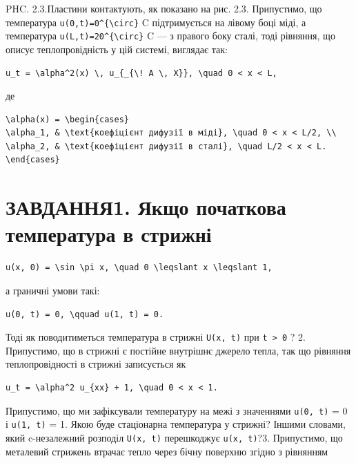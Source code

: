 \documentclass[
  ukrainian,
]{article}
\begin{document}
PHC. 2.3.Пластини контактують, як показано на рис. 2.3. Припустимо, що
температура \texttt{u(0,t)=0\^{}\{\textbackslash{}circ\}} C
підтримується на лівому боці міді, а температура
\texttt{u(L,t)=20\^{}\{\textbackslash{}circ\}} C --- з правого боку
сталі, тоді рівняння, що описує теплопровідність у цій системі, виглядає
так:

\begin{verbatim}
u_t = \alpha^2(x) \, u_{_{\! A \, X}}, \quad 0 < x < L,
\end{verbatim}

де

\begin{verbatim}
\alpha(x) = \begin{cases}
\alpha_1, & \text{коефіцієнт дифузії в міді}, \quad 0 < x < L/2, \\
\alpha_2, & \text{коефіцієнт дифузії в сталі}, \quad L/2 < x < L.
\end{cases}
\end{verbatim}

\section{ЗАВДАННЯ1. Якщо початкова температура в
стрижні}\label{ux437ux430ux432ux434ux430ux43dux43dux44f1.-ux44fux43aux449ux43e-ux43fux43eux447ux430ux442ux43aux43eux432ux430-ux442ux435ux43cux43fux435ux440ux430ux442ux443ux440ux430-ux432-ux441ux442ux440ux438ux436ux43dux456}

\begin{verbatim}
u(x, 0) = \sin \pi x, \quad 0 \leqslant x \leqslant 1,
\end{verbatim}

а граничні умови такі:

\begin{verbatim}
u(0, t) = 0, \qquad u(1, t) = 0.
\end{verbatim}

Тоді як поводитиметься температура в стрижні \texttt{U(x,\ t)} при
\texttt{t\ \textgreater{}\ 0} ? 2. Припустимо, що в стрижні є постійне
внутрішнє джерело тепла, так що рівняння теплопровідності в стрижні
записується як

\begin{verbatim}
u_t = \alpha^2 u_{xx} + 1, \quad 0 < x < 1.
\end{verbatim}

Припустимо, що ми зафіксували температуру на межі з значеннями
\texttt{u(0,\ t)} = 0 і \texttt{u(1,\ t)} = 1. Якою буде стаціонарна
температура у стрижні? Іншими словами, який c-незалежний розподіл
\texttt{U(x,\ t)} перешкоджує \texttt{u(x,\ t)}?3. Припустимо, що
металевий стрижень втрачає тепло через бічну поверхню згідно з рівнянням
\end{document}
